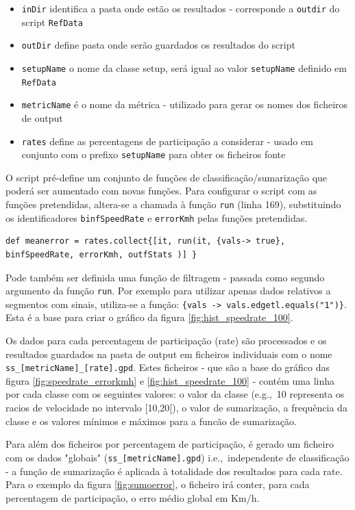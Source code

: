 \documentclass{article}
\newcommand{\ie}{i.e.,\ }
\newcommand{\eg}{e.g.,\ }
\newcommand{\tm}[1]{\texttt{#1}}
\begin{document}
\begin{itemize}
\item \tm{inDir} identifica a pasta onde estão os resultados - corresponde a \tm{outdir} do script \tm{RefData}
\item \tm{outDir} define pasta onde serão guardados os resultados do script
\item \tm{setupName} o nome da classe setup, será igual ao valor \tm{setupName} definido em \tm{RefData}
\item \tm{metricName} é o nome da métrica - utilizado para gerar os nomes dos ficheiros de output
\item \tm{rates} define as percentagens de participação a considerar - usado em conjunto com o prefixo \tm{setupName} para obter os ficheiros fonte
\end{itemize}

O script pré-define um conjunto de funções de classificação/sumarização que poderá ser aumentado com novas funções. Para configurar o script com as funções pretendidas, altera-se a chamada à função \tm{run} (linha 169), substituindo os identificadores \tm{binfSpeedRate} e \tm{errorKmh} pelas funções pretendidas.

\begin{Verbatim}
def meanerror = rates.collect{[it, run(it, {vals-> true}, binfSpeedRate, errorKmh, outfStats )] }
\end{Verbatim}

Pode também ser definida uma função de filtragem - passada como segundo argumento da função \tm{run}. Por exemplo para utilizar apenas dados relativos a segmentos com sinais, utiliza-se a função: \tm{\{vals -> vals.edgetl.equals("1")\}}. Esta é a base para criar o gráfico da figura \ref{fig:hist_speedrate_100}.

Os dados para cada percentagem de participação (rate) são processados e os resultados guardados na pasta de output em ficheiros individuais com o nome \tm{ss\_[metricName]\_[rate].gpd}. Estes ficheiros - que são a base do gráfico das figura \ref{fig:speedrate_errorkmh} e \ref{fig:hist_speedrate_100} - contém uma linha por cada classe com os seguintes valores: o valor da classe (\eg 10 representa os racios de velocidade no intervalo [10,20[), o valor de sumarização, a frequência da classe e os valores mínimos e máximos para a funcão de sumarização. 

Para além dos ficheiros por percentagem de participação, é gerado um ficheiro com os dados "globais" (\tm{ss\_[metricName].gpd}) \ie independente de classificação - a função de sumarização é aplicada à totalidade dos resultados para cada rate. Para o exemplo da figura \ref{fig:sumoerror}, o ficheiro irá conter, para cada percentagem de participação, o erro médio global em Km/h.
\end{document}
